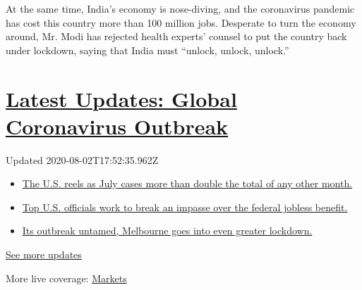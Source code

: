 At the same time, India's economy is nose-diving, and the coronavirus
pandemic has cost this country more than 100 million jobs. Desperate to
turn the economy around, Mr. Modi has rejected health experts' counsel
to put the country back under lockdown, saying that India must ``unlock,
unlock, unlock.''

\hypertarget{latest-updates-global-coronavirus-outbreak}{%
\section{\texorpdfstring{\href{https://www.nytimes.com/2020/08/01/world/coronavirus-covid-19.html?action=click\&pgtype=Article\&state=default\&region=MAIN_CONTENT_1\&context=storylines_live_updates}{Latest
Updates: Global Coronavirus
Outbreak}}{Latest Updates: Global Coronavirus Outbreak}}\label{latest-updates-global-coronavirus-outbreak}}

Updated 2020-08-02T17:52:35.962Z

\begin{itemize}
\tightlist
\item
  \href{https://www.nytimes.com/2020/08/01/world/coronavirus-covid-19.html?action=click\&pgtype=Article\&state=default\&region=MAIN_CONTENT_1\&context=storylines_live_updates\#link-34047410}{The
  U.S. reels as July cases more than double the total of any other
  month.}
\item
  \href{https://www.nytimes.com/2020/08/01/world/coronavirus-covid-19.html?action=click\&pgtype=Article\&state=default\&region=MAIN_CONTENT_1\&context=storylines_live_updates\#link-780ec966}{Top
  U.S. officials work to break an impasse over the federal jobless
  benefit.}
\item
  \href{https://www.nytimes.com/2020/08/01/world/coronavirus-covid-19.html?action=click\&pgtype=Article\&state=default\&region=MAIN_CONTENT_1\&context=storylines_live_updates\#link-2bc8948}{Its
  outbreak untamed, Melbourne goes into even greater lockdown.}
\end{itemize}

\href{https://www.nytimes.com/2020/08/01/world/coronavirus-covid-19.html?action=click\&pgtype=Article\&state=default\&region=MAIN_CONTENT_1\&context=storylines_live_updates}{See
more updates}

More live coverage:
\href{https://www.nytimes.com/live/2020/07/31/business/stock-market-today-coronavirus?action=click\&pgtype=Article\&state=default\&region=MAIN_CONTENT_1\&context=storylines_live_updates}{Markets}

